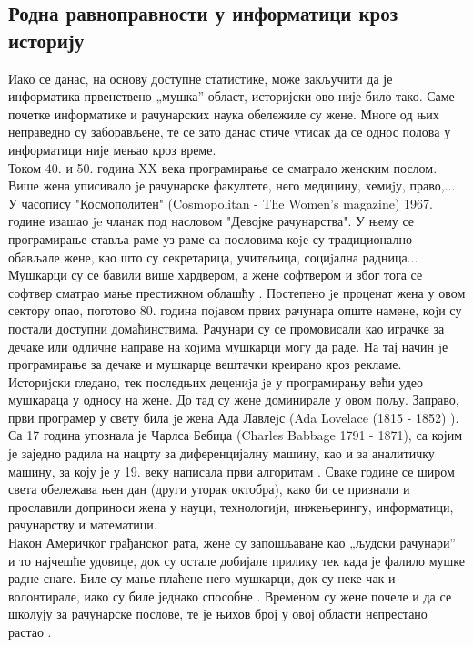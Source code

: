 \documentclass[a4paper]{article}
\begin{document}
\subsection{Родна равноправности у информатици кроз историју}

Иако се данас, на основу доступне статистике, може закључити да је информатика првенствено „мушка”
област, историјски ово није било тако. Саме почетке информатике и рачунарских наука обележиле су 
жене. Многе од њих неправедно су заборављене, те се зато данас стиче утисак да се однос
полова у информатици није мењао кроз време. \\

Током 40. и 50. година XX века програмирање се сматрало женским послом. Више жена уписивало jе 
рачунарске факултете, него медицину, хемиjу, право,... У часопису "Космополитен" (Cosmopolitan - 
The Women's magazine) 1967. године изашао je чланак под насловом "Девојке рачунарства". У њему се 
програмирање ставља раме уз раме са пословима коjе су традиционално обављале жене, као што су 
секретарица, учитељица, социjална радница...\\
Мушкарци су се бавили више хардвером, а жене софтвером и због тога се софтвер сматрао мање 
престижном облашћу \cite{women_softver}. Постепено jе проценат жена у овом сектору опао, поготово 
80. година поjавом првих рачунара опште намене, коjи су постали доступни домаћинствима. Рачунари 
су се промовисали као играчке за дечаке или одличне направе на коjима мушкарци могу да раде. На 
тај начин jе програмирање за дечаке и мушкарце вештачки креирано кроз рекламе.\\

Историjски гледано, тек последњих децениjа jе у програмирању већи удео мушкараца у односу на жене.
До тад су жене доминирале у овом пољу. Заправо, први програмер у свету била jе жена Ада Лавлеjс 
(Ada Lovelace (1815 - 1852) \cite{ada_l}). Са 17 година упознала је Чарлса Бебиџа 
(Charles Babbage 1791 - 1871), са којим је заједно радила на нацрту за диференцијалну машину, као 
и за аналитичку машину, за коју је у 19. веку написала први алгоритам \cite{ada_l_prog}. Сваке 
године се широм света обележава њен дан (други уторак октобра), како би се признали и прославили 
доприноси жена у науци, технологиjи, инжењерингу, информатици, рачунарству и математици. \\
Након Америчког грађанског рата, жене су запошљаване као „људски рачунари” и то најчешће удовице,
док су остале добијале прилику тек када је фалило мушке радне снаге. Биле су мање плаћене него 
мушкарци, док су неке чак и волонтирале, иако су биле једнако способне \cite{women_lover_price}. 
Временом су жене почеле и да се школују за рачунарске послове, те је њихов број у овој области 
непрестано растао \cite{women_education_it}.\\
\end{document}

